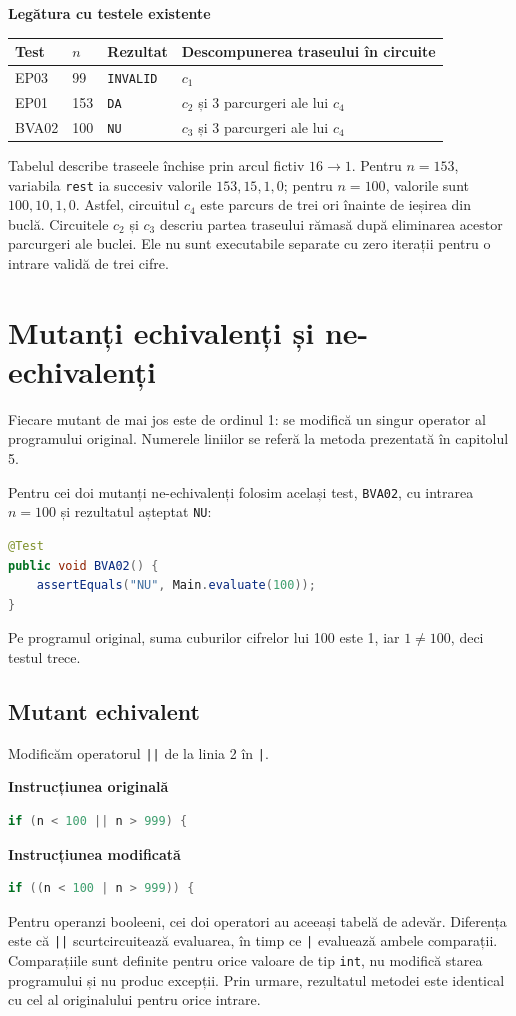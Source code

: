 \documentclass[11pt,a4paper]{article}
\begin{document}
\textbf{Legătura cu testele existente}
\begin{center}
\begin{tabular}{@{}llll@{}}
\toprule
Test & $n$ & Rezultat & Descompunerea traseului în circuite \\
\midrule
EP03 & 99 & \texttt{INVALID} & $c_1$ \\
EP01 & 153 & \texttt{DA} & $c_2$ și 3 parcurgeri ale lui $c_4$ \\
BVA02 & 100 & \texttt{NU} & $c_3$ și 3 parcurgeri ale lui $c_4$ \\
\bottomrule
\end{tabular}
\end{center}
Tabelul describe traseele închise prin arcul fictiv $16\to1$.
Pentru $n=153$, variabila \texttt{rest} ia succesiv valorile $153,15,1,0$;
pentru $n=100$, valorile sunt $100,10,1,0$.
Astfel, circuitul $c_4$ este parcurs de trei ori înainte de ieșirea din buclă.
Circuitele $c_2$ și $c_3$ descriu partea traseului rămasă după eliminarea
acestor parcurgeri ale buclei. Ele nu sunt executabile separate cu zero
iterații pentru o intrare validă de trei cifre.


\section{Mutanți echivalenți și ne-echivalenți}
Fiecare mutant de mai jos este de ordinul 1: se modifică un singur operator
al programului original. Numerele liniilor se referă la metoda prezentată
în capitolul 5.

Pentru cei doi mutanți ne-echivalenți folosim același test,
\texttt{BVA02}, cu intrarea $n=100$ și rezultatul așteptat \texttt{NU}:
\begin{lstlisting}[language=Java,firstnumber=1]
@Test
public void BVA02() {
    assertEquals("NU", Main.evaluate(100));
}
\end{lstlisting}
Pe programul original, suma cuburilor cifrelor lui 100 este 1,
iar $1\ne100$, deci testul trece.

\subsection{Mutant echivalent}
Modificăm operatorul \texttt{||} de la linia 2 în \texttt{|}.

\textbf{Instrucțiunea originală}
\begin{lstlisting}[language=Java,firstnumber=2]
if (n < 100 || n > 999) {
\end{lstlisting}
\textbf{Instrucțiunea modificată}
\begin{lstlisting}[language=Java,firstnumber=2]
if ((n < 100 | n > 999)) {
\end{lstlisting}
Pentru operanzi booleeni, cei doi operatori au aceeași tabelă de adevăr.
Diferența este că \texttt{||} scurtcircuitează evaluarea, în timp ce
\texttt{|} evaluează ambele comparații. Comparațiile sunt definite pentru
orice valoare de tip \texttt{int}, nu modifică starea programului și nu
produc excepții. Prin urmare, rezultatul metodei este identical cu cel al
originalului pentru orice intrare. 
\end{document}

